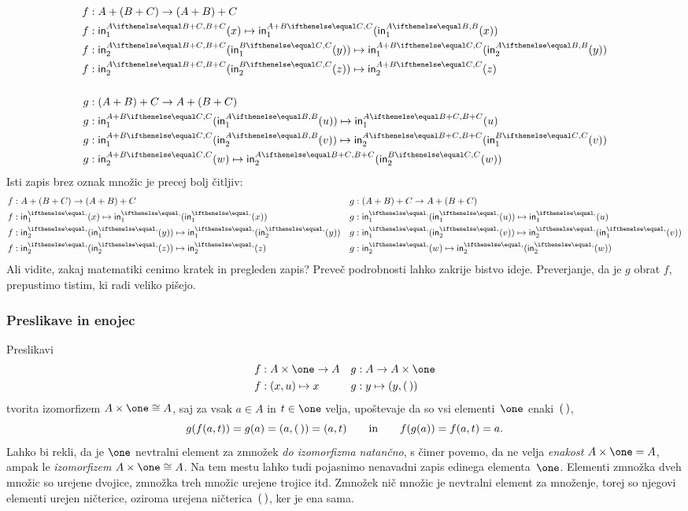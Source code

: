 \begin{align*}
  f &:  A + (B + C) \to (A + B) + C \\
  f &: \inl[A][B+C](x)             \mapsto \inl[A+B][C](\inl[A][B](x)) \\
  f &: \inr[A][B+C](\inl[B][C](y)) \mapsto \inl[A+B][C](\inr[A][B](y)) \\
  f &: \inr[A][B+C](\inr[B][C](z)) \mapsto \inr[A+B][C](z) \\[\baselineskip]
  g &: (A + B) + C \to A + (B + C) \\
  g &: \inl[A+B][C](\inl[A][B](u)) \mapsto \inl[A][B+C](u)\\
  g &: \inl[A+B][C](\inr[A][B](v)) \mapsto \inr[A][B+C](\inl[B][C](v))  \\
  g &: \inr[A+B][C](w)              \mapsto \inr[A][B+C](\inr[B][C](w))
\end{align*}
%
Isti zapis brez oznak množic je precej bolj čitljiv:
%
\begin{align*}
  f &:  A + (B + C) \to (A + B) + C &
  g &: (A + B) + C \to A + (B + C) \\
  f &: \inl(x)             \mapsto \inl(\inl(x)) &
  g &: \inl(\inl(u)) \mapsto \inl(u)\\
  f &: \inr(\inl(y)) \mapsto \inl(\inr(y)) &
  g &: \inl(\inr(v)) \mapsto \inr(\inl(v))  \\
  f &: \inr(\inr(z)) \mapsto \inr(z) &
  g &: \inr(w)              \mapsto \inr(\inr(w))
\end{align*}
%
Ali vidite, zakaj matematiki cenimo kratek in pregleden zapis? Preveč podrobnosti lahko
zakrije bistvo ideje. Preverjanje, da je $g$ obrat $f$, prepustimo tistim, ki radi veliko
pišejo.

\subsubsection{Preslikave in enojec}
\label{sec:preslikave-enojec}

Preslikavi
%
\begin{align*}
  f &: A \times \one \to A &
  g &: A \to A \times \one \\
  f &: (x, u) \mapsto x &
  g &: y \mapsto (y, \unit)
\end{align*}
%
tvorita izomorfizem $A \times \one \cong A$, saj za vsak $a \in A$ in $t \in \one$ velja,
upoštevaje da so vsi elementi~$\one$ enaki~$(\,)$,
%
\begin{equation*}
  g(f(a, t)) = g(a) = (a, (\,)) = (a, t)
  \qquad\text{in}\qquad
  f(g(a)) = f(a, t) = a.
\end{equation*}
%
Lahko bi rekli, da je $\one$ nevtralni element za zmnožek \emph{do izomorfizma natančno},
s čimer povemo, da ne velja \emph{enakost} $A \times \one = A$, ampak le
\emph{izomorfizem} $A \times \one \cong A$. Na tem mestu lahko tudi pojasnimo nenavadni
zapis edinega elementa~$\one$. Elementi zmnožka dveh množic so urejene dvojice, zmnožka
treh množic urejene trojice itd. Zmnožek nič množic je nevtralni element za množenje,
torej so njegovi elementi urejen ničterice, oziroma urejena ničterica~$(\,)$, ker je ena
sama.

